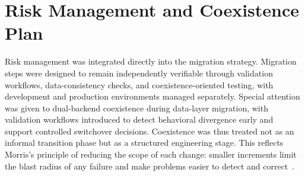 \section{Risk Management and Coexistence Plan}
Risk management was integrated directly into the migration strategy. Migration steps were designed to remain independently verifiable through validation workflows, data-consistency checks, and coexistence-oriented testing, with development and production environments managed separately. Special attention was given to dual-backend coexistence during data-layer migration, with validation workflows introduced to detect behavioral divergence early and support controlled switchover decisions. Coexistence was thus treated not as an informal transition phase but as a structured engineering stage. This reflects Morris's principle of reducing the scope of each change: smaller increments limit the blast radius of any failure and make problems easier to detect and correct~\cite{morris2021iac}.
